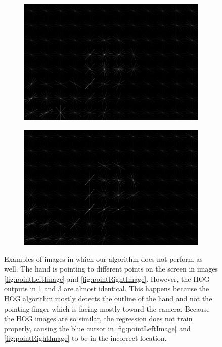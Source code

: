 \documentclass[10pt,twocolumn,letterpaper]{article}
\begin{document}
\begin{center}
\begin{figure}[t]
\begin{center}
		\begin{subfigure}[b]{0.3\textwidth}
			\includegraphics[width=\textwidth]{figures/PointLeftHOG.png}
			\caption{}
			\label{fig:pointLeftHog}
		\end{subfigure}
		\begin{subfigure}[b]{0.3\textwidth}
			\includegraphics[width=\textwidth]{figures/PointRightHOG.png}
			\caption{}
			\label{fig:pointRightHog}
		\end{subfigure}
	\end{center}
	\caption{Examples of images in which our algorithm does not perform as well. The hand is pointing to different points on the screen in images \ref{fig:pointLeftImage} and \ref{fig:pointRightImage}. However, the HOG outputs in \ref{fig:pointLeftHog} and \ref{fig:pointRightHog} are almost identical. This happens because the HOG algorithm mostly detects the outline of the hand and not the pointing finger which is facing mostly toward the camera. Because the HOG images are so similar, the regression does not train properly, causing the blue cursor in \ref{fig:pointLeftImage} and \ref{fig:pointRightImage} to be in the incorrect location.}

\end{figure}
\end{center}
\end{document}
